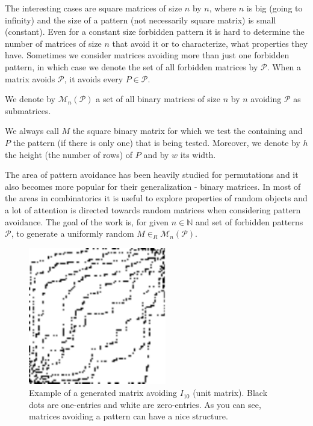 The interesting cases are square matrices of size $n$ by $n$, where $n$ is big (going to infinity) and the size of a pattern (not necessarily square matrix) is small (constant). Even for a constant size forbidden pattern it is hard to determine the number of matrices of size $n$ that avoid it or to characterize, what properties they have. Sometimes we consider matrices avoiding more than just one forbidden pattern, in which case we denote the set of all forbidden matrices by $\mathcal{P}$. When a matrix avoids $\mathcal{P}$, it avoids every $P\in\mathcal{P}$. 
\begin{defn}
We denote by $\mathcal{M}_n(\mathcal{P})$ a set of all binary matrices of size $n$ by $n$ avoiding $\mathcal{P}$ as submatrices.
\end{defn}
\begin{defn}
We always call $M$ the square binary matrix for which we test the containing and $P$ the pattern (if there is only one) that is being tested. Moreover, we denote by $h$ the height (the number of rows) of $P$ and by $w$ its width.
\end{defn}
The area of pattern avoidance has been heavily studied for permutations and it also becomes more popular for their generalization - binary matrices. In most of the areas in combinatorics it is useful to explore properties of random objects and a lot of attention is directed towards random matrices when considering pattern avoidance. The goal of the work is, for given $n\in\mathbb{N}$ and set of forbidden patterns $\mathcal{P}$, to generate a uniformly random $M\in_R\mathcal{M}_n(\mathcal{P})$.
\begin{figure}[h!]
\centering
\includegraphics[width=60mm]{../img/walking-diag.pdf}
\caption{Example of a generated matrix avoiding $I_{10}$ (unit matrix). Black dots are one-entries and white are zero-entries. As you can see, matrices avoiding a pattern can have a nice structure.}
\label{avoiding}
\end{figure}
